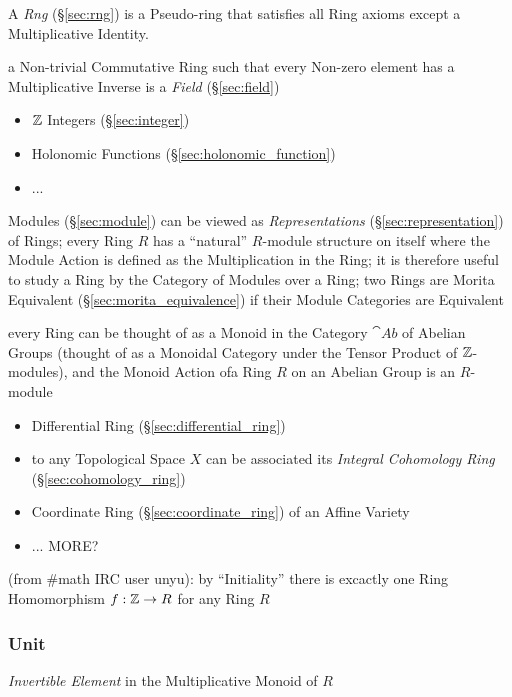 A \emph{Rng} (\S\ref{sec:rng}) is a Pseudo-ring that satisfies all
Ring axioms except a Multiplicative Identity.

a Non-trivial Commutative Ring such that every Non-zero element has a
Multiplicative Inverse is a \emph{Field} (\S\ref{sec:field})

\begin{itemize}
  \item $\mathbb{Z}$ Integers (\S\ref{sec:integer})
  \item Holonomic Functions (\S\ref{sec:holonomic_function})
  \item ...
\end{itemize}

\fist Modules (\S\ref{sec:module}) can be viewed as \emph{Representations}
(\S\ref{sec:representation}) of Rings; every Ring $R$ has a ``natural''
$R$-module structure on itself where the Module Action is defined as the
Multiplication in the Ring; it is therefore useful to study a Ring by the
Category of Modules over a Ring; two Rings are Morita Equivalent
(\S\ref{sec:morita_equivalence}) if their Module Categories are Equivalent

every Ring can be thought of as a Monoid in the Category $\cat{Ab}$ of Abelian
Groups (thought of as a Monoidal Category under the Tensor Product of
$\mathbb{Z}$-modules), and the Monoid Action ofa Ring $R$ on an Abelian Group is an
$R$-module

\begin{itemize}
  \item Differential Ring (\S\ref{sec:differential_ring})
  \item to any Topological Space $X$ can be associated its \emph{Integral
    Cohomology Ring} (\S\ref{sec:cohomology_ring})
  \item Coordinate Ring (\S\ref{sec:coordinate_ring}) of an Affine Variety
  \item ... MORE?
\end{itemize}

(from #math IRC user unyu): by ``Initiality'' there is excactly one Ring
Homomorphism $f : \mathbb{Z} \rightarrow R$ for any Ring $R$



\subsubsection{Unit}\label{sec:ring_unit}

\emph{Invertible Element} in the Multiplicative Monoid of $R$

